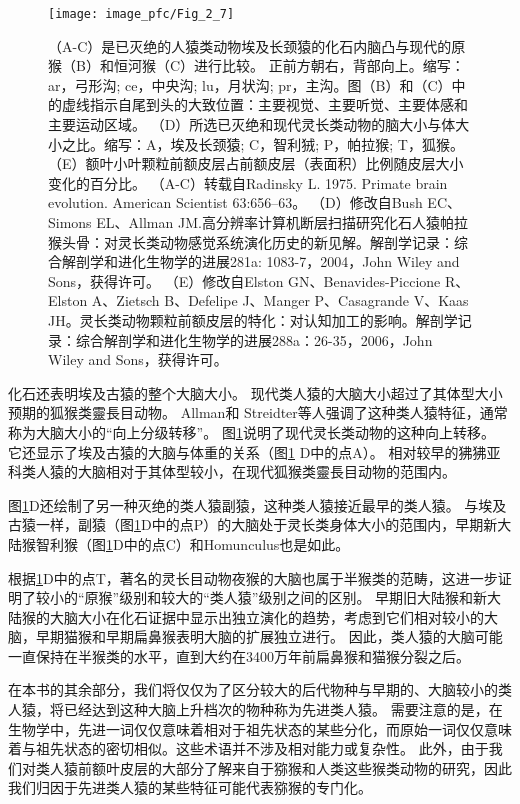 \begin{figure}[!htb]
	\centering
	\texttt{[image: image\_pfc/Fig\_2\_7]}
	\caption{（A-C）是已灭绝的人猿类动物埃及长颈猿的化石内脑凸与现代的原猴（B）和恒河猴（C）进行比较。
		正前方朝右，背部向上。缩写：ar，弓形沟; ce，中央沟; lu，月状沟; pr，主沟。图（B）和（C）中的虚线指示自尾到头的大致位置：主要视觉、主要听觉、主要体感和主要运动区域。 
		（D）所选已灭绝和现代灵长类动物的脑大小与体大小之比。缩写：A，埃及长颈猿; C，智利狨; P，帕拉猴; T，狐猴。 
		（E）额叶小叶颗粒前额皮层占前额皮层（表面积）比例随皮层大小变化的百分比。 （A-C）转载自Radinsky L. 1975. Primate brain evolution. American Scientist 63:656–63。 （D）修改自Bush EC、Simons EL、Allman JM.高分辨率计算机断层扫描研究化石人猿帕拉猴头骨：对灵长类动物感觉系统演化历史的新见解。解剖学记录：综合解剖学和进化生物学的进展281a: 1083-7，2004，John Wiley and Sons，获得许可。 （E）修改自Elston GN、Benavides-Piccione R、Elston A、Zietsch B、Defelipe J、Manger P、Casagrande V、Kaas JH。灵长类动物颗粒前额皮层的特化：对认知加工的影响。解剖学记录：综合解剖学和进化生物学的进展288a：26-35，2006，John Wiley and Sons，获得许可。\label{fig:fig_2_7}}
\end{figure}


化石还表明埃及古猿的整个大脑大小。
现代类人猿的大脑大小超过了其体型大小预期的狐猴类靈長目动物。 Allman\cite{allman1999evolving}和 Streidter\cite{striedter2005principles}等人强调了这种类人猿特征，通常称为大脑大小的“向上分级转移”。
图\ref{fig:fig_2_7}说明了现代灵长类动物的这种向上转移。
它还显示了埃及古猿的大脑与体重的关系（图\ref{fig:fig_2_7} D中的点A）。
相对较早的狒狒亚科类人猿的大脑相对于其体型较小，在现代狐猴类靈長目动物的范围内。


图\ref{fig:fig_2_7}D还绘制了另一种灭绝的类人猿副猿\cite{bush2004high}，这种类人猿接近最早的类人猿\cite{simons2004cranium}。
与埃及古猿一样，副猿（图\ref{fig:fig_2_7}D中的点P）的大脑处于灵长类身体大小的范围内，早期新大陆猴智利猴（图\ref{fig:fig_2_7}D中的点C）\cite{sears2008estimating}和Homunculus\cite{kay2006brain}也是如此。


根据\ref{fig:fig_2_7}D中的点T，著名的灵长目动物夜猴的大脑也属于半猴类的范畴，这进一步证明了较小的“原猴”级别和较大的“类人猿”级别之间的区别。
早期旧大陆猴和新大陆猴的大脑大小在化石证据中显示出独立演化的趋势，考虑到它们相对较小的大脑，早期猫猴和早期扁鼻猴表明大脑的扩展独立进行。
因此，类人猿的大脑可能一直保持在半猴类的水平，直到大约在3400万年前扁鼻猴和猫猴分裂之后。


在本书的其余部分，我们将仅仅为了区分较大的后代物种与早期的、大脑较小的类人猿，将已经达到这种大脑上升档次的物种称为先进类人猿。
需要注意的是，在生物学中，先进一词仅仅意味着相对于祖先状态的某些分化，而原始一词仅仅意味着与祖先状态的密切相似。这些术语并不涉及相对能力或复杂性。
此外，由于我们对类人猿前额叶皮层的大部分了解来自于猕猴和人类这些猴类动物的研究，因此我们归因于先进类人猿的某些特征可能代表猕猴的专门化。


